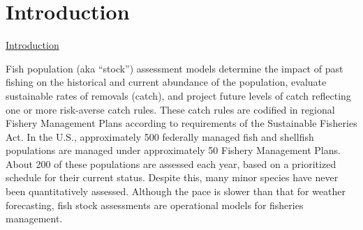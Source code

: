 \section{Introduction}{\protect\hyperref[sec:intro]{Introduction}} \label{sec:intro}

Fish population (aka ``stock'') assessment models determine the impact of past fishing on the historical and current abundance of the population, evaluate sustainable rates of removals (catch), and project future levels of catch reflecting one or more risk-averse catch rules. These catch rules are codified in regional Fishery Management Plans according to requirements of the Sustainable Fisheries Act. In the U.S., approximately 500 federally managed fish and shellfish populations are managed under approximately 50 Fishery Management Plans. About 200 of these populations are assessed each year, based on a prioritized schedule for their current status. Despite this, many minor species have never been quantitatively assessed. Although the pace is slower than that for weather forecasting, fish stock assessments are operational models for fisheries management.



